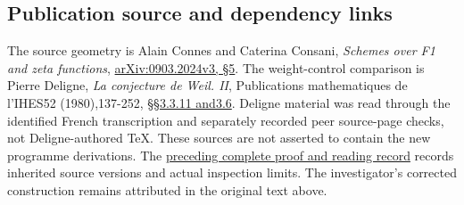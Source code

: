 \subsection{Publication source and dependency
links}\label{publication-source-and-dependency-links}

The source geometry is Alain Connes and Caterina Consani, \emph{Schemes
over F1 and zeta functions},
\href{https://arxiv.org/abs/0903.2024v3}{arXiv:0903.2024v3, §5}. The
weight-control comparison is Pierre Deligne, \emph{La conjecture de
Weil. II}, Publications mathematiques de l'IHES52 (1980),137-252,
\href{https://www.numdam.org/item/PMIHES_1980__52__137_0/}{§§3.3.11
and3.6}. Deligne material was read through the identified French
transcription and separately recorded peer source-page checks, not
Deligne-authored TeX. These sources are not asserted to contain the new
programme derivations. The
\href{https://github.com/KokunoYumeto/zeta-function-research-reader/blob/36a82ecca98addb8a98b48204e349737856c7223/workbenches/splitzero-tandem/continuations/20260924-cohomology-weight-and-character-lifts/BUILD_AND_REVIEW.md}{preceding
complete proof and reading record} records inherited source versions and
actual inspection limits. The investigator's corrected construction
remains attributed in the original text above.
